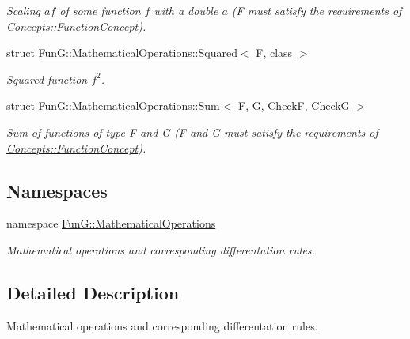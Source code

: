 \begin{DoxyCompactItemize}
\begin{DoxyCompactList}\small\item\em \-Scaling $ af $ of some function $ f $ with a double $ a $ (\-F must satisfy the requirements of \hyperlink{structFunG_1_1Concepts_1_1FunctionConcept}{\-Concepts\-::\-Function\-Concept}). \end{DoxyCompactList}\item 
struct \hyperlink{structFunG_1_1MathematicalOperations_1_1Squared}{\-Fun\-G\-::\-Mathematical\-Operations\-::\-Squared$<$ F, class $>$}
\begin{DoxyCompactList}\small\item\em \-Squared function $f^2$. \end{DoxyCompactList}\item 
struct \hyperlink{structFunG_1_1MathematicalOperations_1_1Sum}{\-Fun\-G\-::\-Mathematical\-Operations\-::\-Sum$<$ F, G, Check\-F, Check\-G $>$}
\begin{DoxyCompactList}\small\item\em \-Sum of functions of type \-F and \-G (\-F and \-G must satisfy the requirements of \hyperlink{structFunG_1_1Concepts_1_1FunctionConcept}{\-Concepts\-::\-Function\-Concept}). \end{DoxyCompactList}\end{DoxyCompactItemize}
\subsection*{\-Namespaces}
\begin{DoxyCompactItemize}
\item 
namespace \hyperlink{namespaceFunG_1_1MathematicalOperations}{\-Fun\-G\-::\-Mathematical\-Operations}
\begin{DoxyCompactList}\small\item\em \-Mathematical operations and corresponding differentation rules. \end{DoxyCompactList}\end{DoxyCompactItemize}


\subsection{\-Detailed \-Description}
\-Mathematical operations and corresponding differentation rules. 